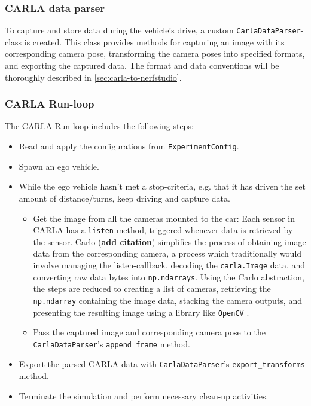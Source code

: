\subsubsection{CARLA data parser}

To capture and store data during the vehicle’s drive, a custom \texttt{CarlaDataParser}-class is created. This class provides methods for capturing an image with its corresponding camera pose, transforming the camera poses into specified formats, and exporting the captured data. The format and data conventions will be thoroughly described in \autoref{sec:carla-to-nerfstudio}.

\subsubsection{CARLA Run-loop}
The CARLA Run-loop includes the following steps:

\begin{itemize}
    \item Read and apply the configurations from \texttt{ExperimentConfig}.
    \item Spawn an ego vehicle.
    \item While the ego vehicle hasn’t met a stop-criteria, e.g. that it has driven the set amount of distance/turns, keep driving and capture data.
    \begin{itemize}
        \item Get the image from all the cameras mounted to the car: Each sensor in CARLA has a \texttt{listen} method, triggered whenever data is retrieved by the sensor. Carlo (\textbf{add citation}) simplifies the process of obtaining image data from the corresponding camera, a process which traditionally would involve managing the listen-callback, decoding the \texttt{carla.Image} data, and converting raw data bytes into \texttt{np.ndarrays}. Using the Carlo abstraction, the steps are reduced to creating a list of cameras, retrieving the \texttt{np.ndarray} containing the image data, stacking the camera outputs, and presenting the resulting image using a library like \texttt{OpenCV} \cite{opencv_library}.
        \item Pass the captured image and corresponding camera pose to the \texttt{CarlaDataParser}'s \texttt{append\_frame} method.
    \end{itemize}
    \item Export the parsed CARLA-data with \texttt{CarlaDataParser}'s \texttt{export\_transforms} method.
    \item Terminate the simulation and perform necessary clean-up activities.
\end{itemize}


